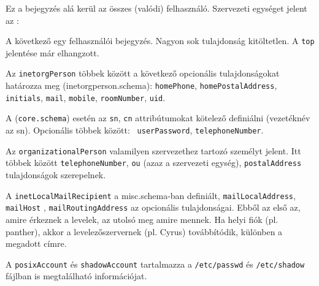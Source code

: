 

Ez a bejegyzés alá kerül az összes (valódi) felhasználó. Szervezeti egységet jelent az :


A következő egy felhasználói bejegyzés. Nagyon sok tulajdonság kitöltetlen. A \texttt{top} jelentése már elhangzott.

Az \texttt{inetorgPerson} többek között a következő opcionális tulajdonságokat határozza meg (inetorgperson.schema):
\texttt{homePhone}, \texttt{homePostalAddress}, \texttt{initials}, \texttt{mail},  \texttt{mobile},
\texttt{roomNumber}, \texttt{uid}.

A  (\texttt{core.schema}) esetén az \texttt{sn}, \texttt{cn} attribútumokat kötelező definiálni
(vezetéknév az sn). Opcionális többek között: \texttt{ userPassword}, \texttt{telephoneNumber}.


Az \texttt{organizationalPerson} valamilyen szervezethez tartozó személyt jelent. Itt többek között
\texttt{telephoneNumber}, \texttt{ou} (azaz a szervezeti egység), \texttt{postalAddress} tulajdonságok szerepelnek.

A \texttt{inetLocalMailRecipient} a misc.schema-ban definiált, \texttt{mailLocalAddress}, \texttt{mailHost} ,
\texttt{mailRoutingAddress} az opcionális tulajdonságai. Ebből az első az, amire érkeznek a levelek, az utolsó meg
amire mennek. Ha helyi fiók (pl. panther), akkor a levelezőszervernek (pl. Cyrus) továbbítódik, különben a megadott
címre.

A \texttt{posixAccount} és \texttt{shadowAccount} tartalmazza a \texttt{/etc/passwd} és \texttt{/etc/shadow} fájlban
is megtalálható információjat.



